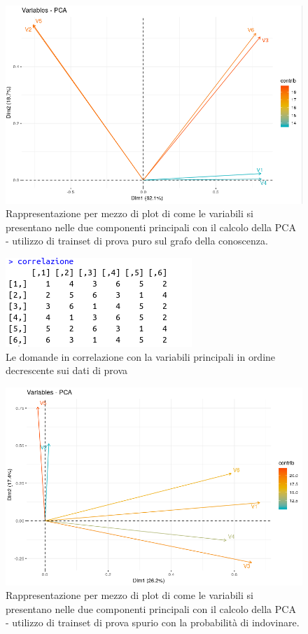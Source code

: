\begin{figure}[H]
\centering
	\includegraphics[width=0.80\linewidth]{../../PCA/plot/PCA.png}
	\caption{Rappresentazione per mezzo di plot di come le variabili si presentano nelle due componenti principali con il calcolo della PCA - utilizzo di trainset di prova puro sul grafo della conoscenza.}
\end{figure}

\begin{figure}[H]
\centering
	\includegraphics[width=0.60\linewidth]{../../PCA/plot/correlazione_base.png}
	\caption{Le domande in correlazione con la variabili principali in ordine decrescente sui dati di prova}
\end{figure}


\begin{figure}[H]
\centering
	\includegraphics[width=0.80\linewidth]{../../PCA/plot/PCA-valorindovinati.png}
	\caption{Rappresentazione per mezzo di plot di come le variabili si presentano nelle due componenti principali con il calcolo della PCA - utilizzo di trainset di prova spurio con la probabilit\`a di indovinare.}
\end{figure}


